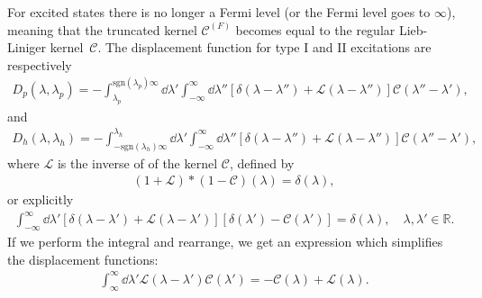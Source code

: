 \documentclass[11pt, a4paper,draft]{report} %
\newcommand{\inversetruncc}{\mathcal{L}}
\newcommand{\kernel}{\mathcal{C}}
\begin{document}
For excited states there is no longer a Fermi level \cite{tofind} (or the Fermi level goes to \(\infty\)), meaning that the truncated kernel \(\kernel^{(F)}\) becomes equal to the regular Lieb-Liniger kernel~\(\kernel\).
The displacement function for type I and II excitations are respectively \cite{tofind}
\begin{align}
	D_p(\lambda, \lambda_p) = - \int_{\lambda_p}^{\textrm{sgn}(\lambda_p)\infty} \dd \lambda' \int_{-\infty}^{\infty} \dd  \lambda'' \left[\delta(\lambda-\lambda'') + \inversetruncc(\lambda-\lambda'') \right]\kernel(\lambda''-\lambda'),
\end{align}
and
\begin{align}
	D_h(\lambda, \lambda_h) = - \int_{-\textrm{sgn}(\lambda_h)\infty}^{\lambda_h} \dd \lambda' \int_{-\infty}^{\infty} \dd \lambda'' \left[\delta(\lambda-\lambda'') + \inversetruncc(\lambda - \lambda'') \right]\kernel(\lambda''-\lambda'),
\end{align}
where \(\inversetruncc\) is the inverse of of the kernel \(\kernel\), defined by \cite{tofind}
\begin{align}
	(1+\inversetruncc)*(1-\kernel)(\lambda) = \delta(\lambda),
\end{align}
or explicitly
\begin{align}
	\int_{-\infty}^{\infty} \dd \lambda' \left[ \delta(\lambda-\lambda') + \inversetruncc(\lambda-\lambda') \right] \left[ \delta(\lambda') - \kernel(\lambda')\right] = \delta(\lambda), \quad \lambda, \lambda' \in \mathbb{R}.
\end{align}
If we perform the integral and rearrange, we get an expression which simplifies the displacement functions:
\begin{align}\label{eq:kernelinversion}
	\int_{\infty}^{\infty} \dd \lambda' \inversetruncc(\lambda-\lambda') \kernel(\lambda') = -\kernel(\lambda) + \inversetruncc(\lambda).
\end{align}
\end{document}
